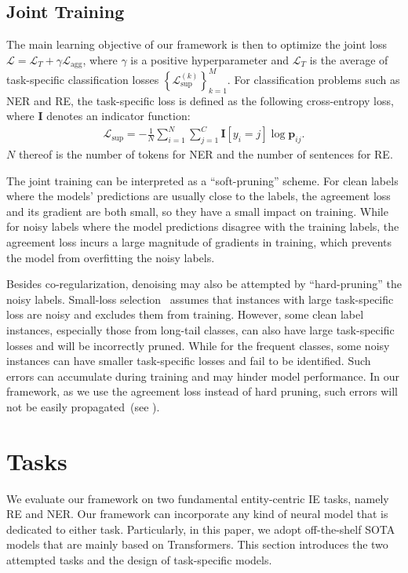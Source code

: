 \documentclass[11pt]{article}
\begin{document}
\subsection{Joint Training}
The main learning objective of our framework is then to optimize the joint loss $\mathcal{L}=\mathcal{L}_T+\gamma\mathcal{L}_\text{agg}$, where $\gamma$ is a positive hyperparameter and $\mathcal{L}_T$ is the average of task-specific classification losses $\left\{\mathcal{L}_\text{sup}^{(k)}\right\}_{k=1}^M$. 
For classification problems such as NER and RE, the task-specific loss is defined as the following cross-entropy loss, where $\bm{I}$ denotes an indicator function:
\begin{align}
    \mathcal{L}_\text{sup} = -\frac{1}{N}\sum_{i=1}^N\sum_{j=1}^C \bm{I}\left[y_i = j\right] \log \bm{p}_{ij}.
\end{align}
$N$ thereof is the number of tokens for NER and the number of sentences for RE.

The joint training can be interpreted as a ``soft-pruning'' scheme.
For clean labels where the models' predictions are usually close to the labels, the agreement loss and its gradient are both small, so they have a small impact on training.
While for noisy labels where the model predictions disagree with the training labels, the agreement loss incurs a large magnitude of gradients in training, which prevents the model from overfitting the noisy labels.

Besides co-regularization, denoising may also be attempted by ``hard-pruning'' the noisy labels.
Small-loss selection~\cite{Jiang2018MentorNetLD,Han2018CoteachingRT} assumes that instances with large task-specific loss are noisy and excludes them from training.
However, some clean label instances, especially those from long-tail classes, can also have large task-specific losses and will be incorrectly pruned.
While for the frequent classes, some noisy instances can have smaller task-specific losses and fail to be identified.
Such errors can accumulate during training and may hinder model performance.
In our framework, as we use the agreement loss instead of hard pruning, such errors will not be easily propagated~(see ).

\section{Tasks}



We evaluate our framework on two fundamental entity-centric IE tasks, namely RE and NER.
Our framework can incorporate any kind of neural model that is dedicated to either task.
Particularly, in this paper, we adopt off-the-shelf SOTA models that are mainly based on Transformers.
This section introduces the two attempted tasks and the design of task-specific models.
\end{document}
